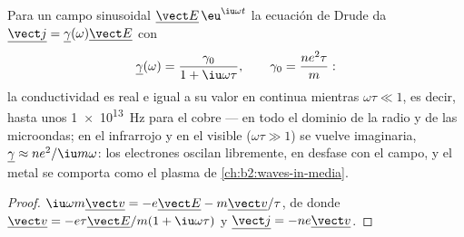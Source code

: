 \begin{proposition}\label{prop:b2:charges-currents-conduction:acdrude}
Para un campo sinusoidal $\underline{\vect E}\,\eu^{\iu\omega t}$ la ecuación de
Drude da $\underline{\vect j} = \underline\gamma(\omega)\underline{\vect E}$ con
\[
\underline\gamma(\omega) = \frac{\gamma_0}{1 + \iu\omega\tau} , \qquad \gamma_0 = \frac{ne^2\tau}{m} :
\]
la conductividad es real e igual a su valor en continua mientras $\omega\tau
\ll 1$, es decir, hasta unos \qty{1e13}{Hz} para el cobre --- en todo el
dominio de la radio y de las microondas; en el infrarrojo y en el visible
($\omega\tau \gg 1$) se vuelve imaginaria, $\underline\gamma \approx ne^2/\iu m\omega$: los electrones
oscilan libremente, en desfase con el campo, y el metal se comporta como
el plasma de \cref{ch:b2:waves-in-media}.
\end{proposition}

\begin{proof}
$\iu\omega m\underline{\vect v} = -e\underline{\vect E} - m\underline{\vect v}/\tau$, de donde
$\underline{\vect v} = -e\tau\underline{\vect E}/m(1 + \iu\omega\tau)$ y $\underline{\vect j}
= -ne\underline{\vect v}$.
\end{proof}

